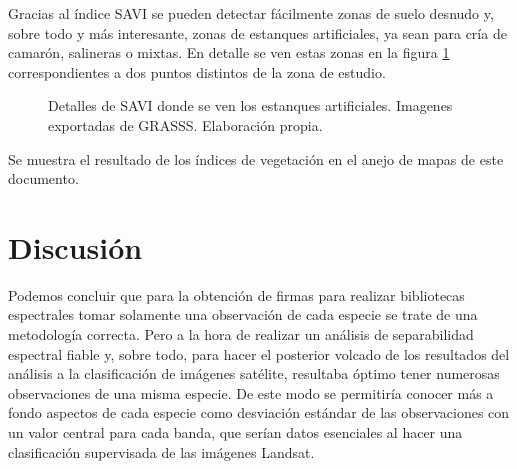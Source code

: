 Gracias al índice \ac{SAVI} se pueden detectar fácilmente zonas de suelo desnudo y, sobre todo y más interesante, zonas de estanques artificiales, ya sean para cría de camarón, salineras o mixtas. En detalle se ven estas zonas en la figura \ref{fig:detalle_estanques} correspondientes a dos puntos distintos de la zona de estudio.%

\begin{figure}
	\centering
	\caption[Detalle de estanques en SAVI]{Detalles de SAVI donde se ven los estanques artificiales. Imagenes exportadas de GRASSS. Elaboración propia.}
	\label{fig:detalle_estanques}
\end{figure}

Se muestra el resultado de los índices de vegetación en el anejo de mapas de este documento.

\section{Discusión}

Podemos concluir que para la obtención de firmas para realizar bibliotecas espectrales tomar solamente una observación de cada especie se trate de una metodología correcta. Pero a la hora de realizar un análisis de separabilidad espectral fiable y, sobre todo, para hacer el posterior volcado de los resultados del análisis a la clasificación de imágenes satélite, resultaba óptimo tener numerosas observaciones de una misma especie. De este modo se permitiría conocer más a fondo aspectos de cada especie como desviación estándar de las observaciones con un valor central para cada banda, que serían datos esenciales al hacer una clasificación supervisada de las imágenes Landsat.%

